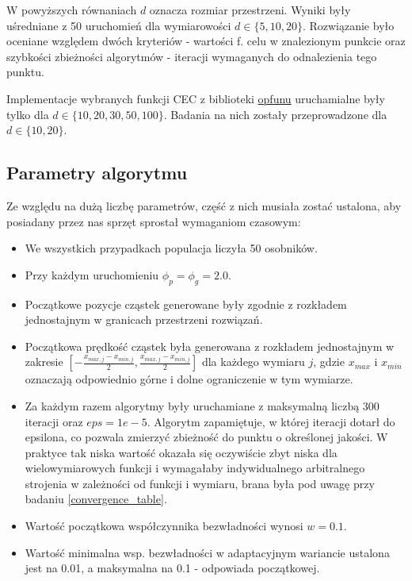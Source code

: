 \documentclass[12pt]{article}
\begin{document}
W powyższych równaniach \(d\) oznacza rozmiar przestrzeni. Wyniki były uśredniane z 50 uruchomień dla wymiarowości \(d \in \{5, 10, 20\}\).
Rozwiązanie było oceniane względem dwóch kryteriów - wartości f. celu w znalezionym punkcie oraz szybkości
zbieżności algorytmów - iteracji wymaganych do odnalezienia tego punktu.

Implementacje wybranych funkcji CEC z biblioteki \href{https://github.com/thieu1995/opfunu}{opfunu} uruchamialne
były tylko dla $d \in \{ 10, 20, 30, 50, 100 \}$. Badania na nich zostały przeprowadzone dla $d \in \{ 10, 20 \}$.

\subsection{Parametry algorytmu}
Ze względu na dużą liczbę parametrów, część z nich musiała zostać ustalona, aby posiadany przez nas sprzęt sprostał wymaganiom czasowym:

\begin{itemize}
	\item We wszystkich przypadkach populacja liczyła 50 osobników.
	\item Przy każdym uruchomieniu $\phi_p = \phi_g = 2.0$.
	\item Początkowe pozycje cząstek generowane były zgodnie z rozkładem jednostajnym w granicach przestrzeni rozwiązań.
	\item Początkowa prędkość cząstek była generowana z rozkładem jednostajnym w zakresie $[-\frac{x_{max, j}-x_{min, j}}{2}, \frac{x_{max, j}-x_{min, j}}{2}]$ dla każdego wymiaru \(j\), gdzie $x_{max}$ i $x_{min}$ oznaczają odpowiednio
	      górne i dolne ograniczenie w tym wymiarze.
	\item Za każdym razem algorytmy były uruchamiane z maksymalną liczbą 300 iteracji oraz $eps = 1e-5$. Algorytm zapamiętuje,
	      w której iteracji dotarł do epsilona, co pozwala zmierzyć zbieżność do punktu o określonej jakości. W praktyce tak niska
	      wartość okazała się oczywiście zbyt niska dla wielowymiarowych funkcji i wymagałaby indywidualnego arbitralnego strojenia
	      w zależności od funkcji i wymiaru, brana była pod uwagę przy badaniu \ref{convergence_table}.
	\item Wartość początkowa współczynnika bezwładności wynosi $w = 0.1$.
	\item Wartość minimalna wsp. bezwładności w adaptacyjnym wariancie ustalona jest na 0.01, a maksymalna na 0.1 - odpowiada początkowej.
\end{itemize}
\end{document}
